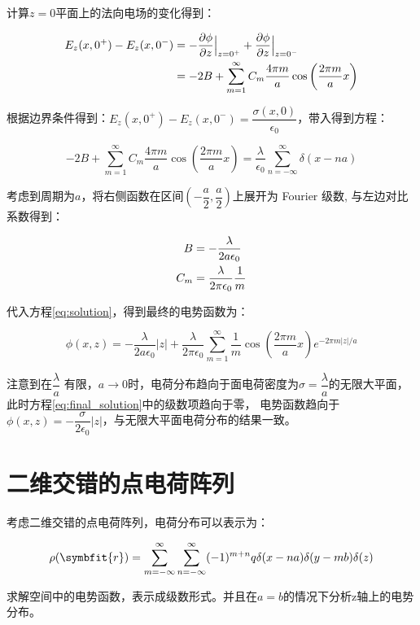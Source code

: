 \documentclass[11pt,a4paper]{ctexart}
\begin{document}
计算$z=0$平面上的法向电场的变化得到：

\begin{align}
    E_z(x,0^+)-E_z(x,0^-)&=-\frac{\partial\phi}{\partial z}\Big|_{z=0^+}+\frac{\partial\phi}{\partial z}\Big|_{z=0^-} \notag\\
    &=-2B+\sum_{m=1}^{\infty}C_{m}\frac{4\pi m}{a}\cos\left(\frac{2\pi m}{a} x\right) \notag
    \label{eq:Ez_jump}
\end{align}

根据边界条件得到：$E_z(x,0^+)-E_z(x,0^-)=\dfrac{\sigma(x,0)}{\epsilon_0}$，带入得到方程：

\begin{equation}
    -2B+\sum_{m=1}^{\infty}C_{m}\frac{4\pi m}{a}\cos\left(\frac{2\pi m}{a} x\right)=\frac{\lambda}{\epsilon_0}\sum_{n=-\infty}^{\infty}\delta(x-na)
    \label{eq:boundary_condition}
\end{equation}

考虑到周期为$a$，将右侧函数在区间$(-\dfrac{a}{2},\dfrac{a}{2})$上展开为 Fourier 级数, 与左边对比系数得到：

\begin{align}
    B&=-\frac{\lambda}{2a\epsilon_0} \notag\\
    C_m&=\frac{\lambda}{2\pi\epsilon_0}\frac{1}{m} \notag
\end{align}

代入方程\eqref{eq:solution}，得到最终的电势函数为：

\begin{equation}
    \phi(x,z)=-\frac{\lambda}{2a\epsilon_0}\left|z\right|+\frac{\lambda}{2\pi\epsilon_0}\sum_{m=1}^{\infty}\frac{1}{m}\cos\left(\frac{2\pi m}{a} x\right)e^{-2\pi m\left|z\right|/a}
    \label{eq:final_solution}
\end{equation}

\bigskip

注意到在$\dfrac{\lambda}{a}$ 有限，$a \to 0$时，电荷分布趋向于面电荷密度为$\sigma=\dfrac{\lambda}{a}$的无限大平面，
此时方程\eqref{eq:final_solution}中的级数项趋向于零，
电势函数趋向于$\phi(x,z)=-\dfrac{\sigma}{2\epsilon_0}\left|z\right|$，与无限大平面电荷分布的结果一致。

\section{二维交错的点电荷阵列}

\begin{block}
    {\kaishu 考虑二维交错的点电荷阵列，电荷分布可以表示为：

    \begin{equation}
        \rho(\symbfit{r})=\sum_{m=-\infty}^{\infty}\sum_{n=-\infty}^{\infty}(-1)^{m+n}q\delta(x-na)\delta(y-mb)\delta(z)
        \label{eq:charge_distribution2}
    \end{equation}

    求解空间中的电势函数，表示成级数形式。并且在$a=b$的情况下分析z轴上的电势分布。
    }
\end{block} 
\end{document}
